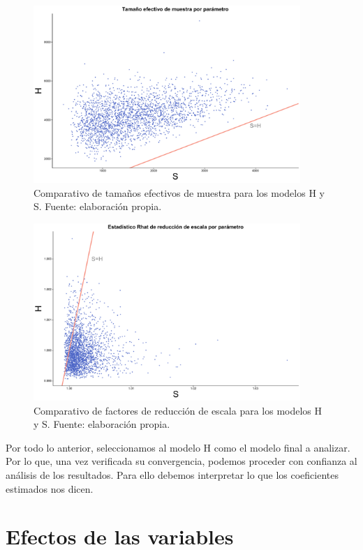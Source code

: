 \begin{figure}[H]
	\centering
	\includegraphics[width = 0.9\textwidth]{Figs/Convergencia/Compara_n_eff}
	\caption{Comparativo de tamaños efectivos de muestra para los modelos H y S. Fuente: elaboración propia.}
	\label{fig:N_eff_compara}
\end{figure} 

\begin{figure}[H]
	\centering
	\includegraphics[width = 0.9\textwidth]{Figs/Convergencia/Compara_Rhat}
	\caption{Comparativo de factores de reducción de escala para los modelos H y S. Fuente: elaboración propia.}
	\label{fig:Rhat_compara}
\end{figure} 
 
  Por todo lo anterior, seleccionamos al modelo H como el modelo final a analizar. Por lo que, una vez verificada su convergencia, podemos proceder con confianza al análisis de los resultados. Para ello debemos interpretar lo que los coeficientes estimados nos dicen. 
 
\section{Efectos de las variables}

